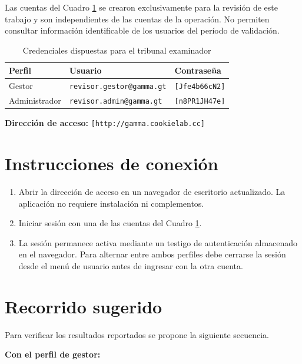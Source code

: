 Las cuentas del Cuadro \ref{tab:credenciales} se crearon exclusivamente para la revisión de este trabajo y son independientes de las cuentas de la operación. No permiten consultar información identificable de los usuarios del período de validación.

\begin{table}[!htb]
\centering
\small
\caption{Credenciales dispuestas para el tribunal examinador}
\label{tab:credenciales}
\begin{tabular}{lll}
\toprule
\textbf{Perfil} & \textbf{Usuario} & \textbf{Contraseña} \\
\midrule
Gestor          & \texttt{revisor.gestor@gamma.gt} & \texttt{[Jfe4b66cN2]} \\
Administrador   & \texttt{revisor.admin@gamma.gt}  & \texttt{[n8PR1JH47e]} \\
\bottomrule
\end{tabular}
\end{table}

\noindent\textbf{Dirección de acceso:} \texttt{[http://gamma.cookielab.cc]}

\section*{Instrucciones de conexión}

\begin{enumerate}
	\item Abrir la dirección de acceso en un navegador de escritorio actualizado. La aplicación no requiere instalación ni complementos.
	\item Iniciar sesión con una de las cuentas del Cuadro \ref{tab:credenciales}.
	\item La sesión permanece activa mediante un testigo de autenticación almacenado en el navegador. Para alternar entre ambos perfiles debe cerrarse la sesión desde el menú de usuario antes de ingresar con la otra cuenta.
\end{enumerate}

\section*{Recorrido sugerido}

Para verificar los resultados reportados se propone la siguiente secuencia.

\vspace{0.5em}
\noindent\textbf{Con el perfil de gestor:}

